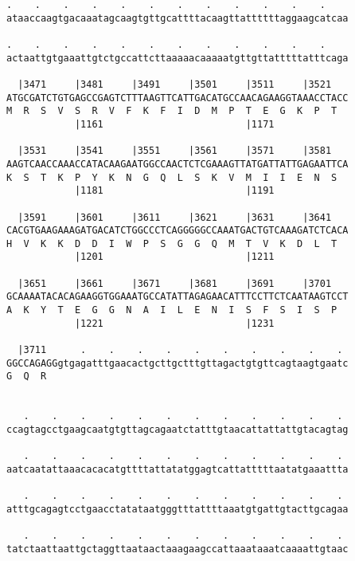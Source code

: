 \documentclass{article}
\begin{document}
\begin{Verbatim}
.    .    .    .    .    .    .    .    .    .    .    .    
ataaccaagtgacaaatagcaagtgttgcattttacaagttattttttaggaagcatcaa
                                                            
.    .    .    .    .    .    .    .    .    .    .    .    
actaattgtgaaattgtctgccattcttaaaaacaaaaatgttgttatttttatttcaga
                                                            
  |3471     |3481     |3491     |3501     |3511     |3521   
ATGCGATCTGTGAGCCGAGTCTTTAAGTTCATTGACATGCCAACAGAAGGTAAACCTACC
M  R  S  V  S  R  V  F  K  F  I  D  M  P  T  E  G  K  P  T  
            |1161                         |1171             
  
  |3531     |3541     |3551     |3561     |3571     |3581   
AAGTCAACCAAACCATACAAGAATGGCCAACTCTCGAAAGTTATGATTATTGAGAATTCA
K  S  T  K  P  Y  K  N  G  Q  L  S  K  V  M  I  I  E  N  S  
            |1181                         |1191             
  
  |3591     |3601     |3611     |3621     |3631     |3641   
CACGTGAAGAAAGATGACATCTGGCCCTCAGGGGGCCAAATGACTGTCAAAGATCTCACA
H  V  K  K  D  D  I  W  P  S  G  G  Q  M  T  V  K  D  L  T  
            |1201                         |1211             
  
  |3651     |3661     |3671     |3681     |3691     |3701   
GCAAAATACACAGAAGGTGGAAATGCCATATTAGAGAACATTTCCTTCTCAATAAGTCCT
A  K  Y  T  E  G  G  N  A  I  L  E  N  I  S  F  S  I  S  P  
            |1221                         |1231             
  
  |3711      .    .    .    .    .    .    .    .    .    . 
GGCCAGAGGgtgagatttgaacactgcttgctttgttagactgtgttcagtaagtgaatc
G  Q  R                                                     
                                                            
  
   .    .    .    .    .    .    .    .    .    .    .    . 
ccagtagcctgaagcaatgtgttagcagaatctatttgtaacattattattgtacagtag
                                                            
   .    .    .    .    .    .    .    .    .    .    .    . 
aatcaatattaaacacacatgttttattatatggagtcattatttttaatatgaaattta
                                                            
   .    .    .    .    .    .    .    .    .    .    .    . 
atttgcagagtcctgaacctatataatgggtttattttaaatgtgattgtacttgcagaa
                                                            
   .    .    .    .    .    .    .    .    .    .    .    . 
tatctaattaattgctaggttaataactaaagaagccattaaataaatcaaaattgtaac
                                                            

\end{Verbatim}
\end{document}
